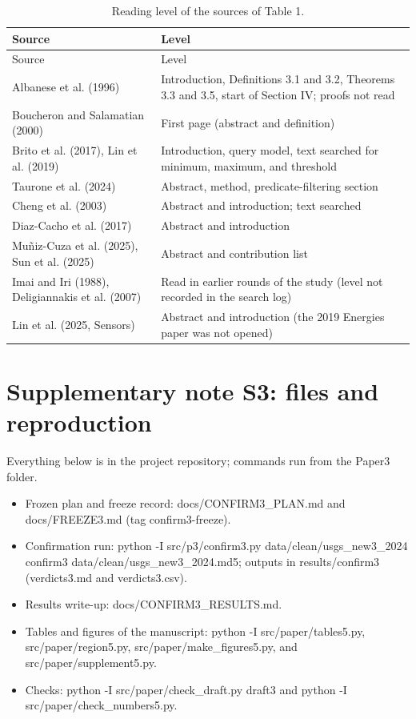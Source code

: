 \documentclass[12pt]{article}
\begin{document}
{\footnotesize
\begin{longtable}{@{}p{5.2cm}p{9cm}@{}}
\caption{Reading level of the sources of Table 1.}\\
\toprule
Source & Level \\
\midrule
\endfirsthead
\toprule
Source & Level \\
\midrule
\endhead
\bottomrule
\endfoot
Albanese et al. (1996) & Introduction, Definitions 3.1 and 3.2, Theorems 3.3 and 3.5, start of Section IV; proofs not read \\
Boucheron and Salamatian (2000) & First page (abstract and definition) \\
Brito et al. (2017), Lin et al. (2019) & Introduction, query model, text searched for minimum, maximum, and threshold \\
Taurone et al. (2024) & Abstract, method, predicate-filtering section \\
Cheng et al. (2003) & Abstract and introduction; text searched \\
Diaz-Cacho et al. (2017) & Abstract and introduction \\
Mu\~niz-Cuza et al. (2025), Sun et al. (2025) & Abstract and contribution list \\
Imai and Iri (1988), Deligiannakis et al. (2007) & Read in earlier rounds of the study (level not recorded in the search log) \\
Lin et al. (2025, Sensors) & Abstract and introduction (the 2019 Energies paper was not opened) \\
\end{longtable}
}

\section*{Supplementary note S3: files and reproduction}
Everything below is in the project repository; commands run from the Paper3 folder.
\begin{itemize}
  \item Frozen plan and freeze record: docs/CONFIRM3\_PLAN.md and docs/FREEZE3.md (tag confirm3-freeze).
  \item Confirmation run: python -I src/p3/confirm3.py data/clean/usgs\_new3\_2024 confirm3 data/clean/usgs\_new3\_2024.md5; outputs in results/confirm3 (verdicts3.md and verdicts3.csv).
  \item Results write-up: docs/CONFIRM3\_RESULTS.md.
  \item Tables and figures of the manuscript: python -I src/paper/tables5.py, src/paper/region5.py, src/paper/make\_figures5.py, and src/paper/supplement5.py.
  \item Checks: python -I src/paper/check\_draft.py draft3 and python -I src/paper/check\_numbers5.py.
\end{itemize}
\end{document}
